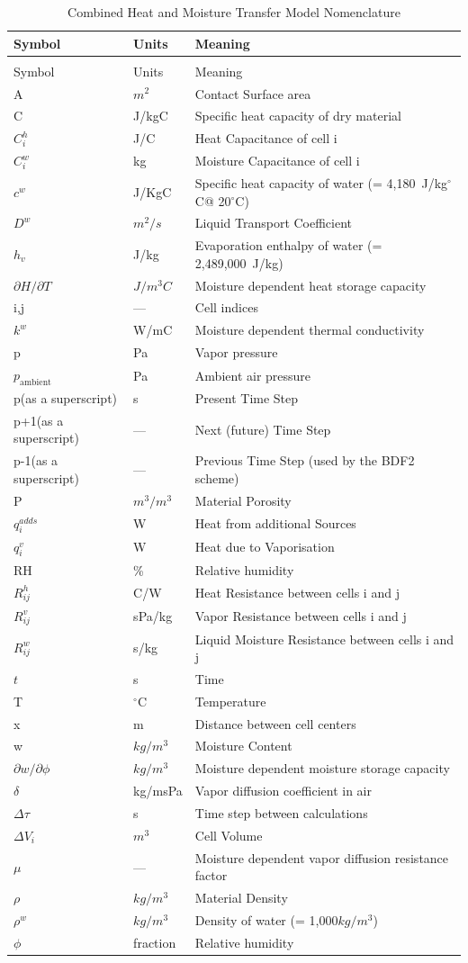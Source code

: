 \begin{longtable}[c]{p{1.5in}p{1.0in}p{3.5in}}
\caption{Combined Heat and Moisture Transfer Model Nomenclature \label{table:combined-heat-and-moisture-transfer-model}} \tabularnewline
\toprule
Symbol & Units & Meaning \tabularnewline
\midrule
\endfirsthead

\caption[]{Combined Heat and Moisture Transfer Model Nomenclature} \tabularnewline
\toprule
Symbol & Units & Meaning \tabularnewline
\midrule
\endhead

A & $m^2$ & Contact Surface area \tabularnewline
C & J/kgC & Specific heat capacity of dry material \tabularnewline
$C_i^h$ & J/C & Heat Capacitance of cell i \tabularnewline
$C_i^w$ & kg & Moisture Capacitance of cell i \tabularnewline
$c^{w}$ & J/KgC & Specific heat capacity of water (= 4,180~J/kg$^{\circ}$C@ 20$^{\circ}$C) \tabularnewline
${D^w}$ & $m^2/s$ & Liquid Transport Coefficient \tabularnewline
${h_v}$ & J/kg & Evaporation enthalpy of water (= 2,489,000~J/kg) \tabularnewline
$\partial{H}/\partial{T}$ & $J/m^3C$ & Moisture dependent heat storage capacity \tabularnewline
i,j & --- & Cell indices \tabularnewline
${k^w}$ & W/mC & Moisture dependent thermal conductivity \tabularnewline
p & Pa & Vapor pressure \tabularnewline
$p_{\text{ambient}}$ & Pa & Ambient air pressure \tabularnewline
p(as a superscript) & s & Present Time Step \tabularnewline
p+1(as a superscript) & --- & Next (future) Time Step \tabularnewline
p-1(as a superscript) & --- & Previous Time Step (used by the BDF2 scheme) \tabularnewline
P & $m^3/m^3$ & Material Porosity \tabularnewline
${q_i^{adds}}$ & W & Heat from additional Sources \tabularnewline
${q_i^v}$ & W & Heat due to Vaporisation \tabularnewline
RH & \% & Relative humidity \tabularnewline
$R_{ij}^h$ & C/W & Heat Resistance between cells i and j \tabularnewline
$R_{ij}^v$ & sPa/kg & Vapor Resistance between cells i and j \tabularnewline
$R_{ij}^w$ & s/kg & Liquid Moisture Resistance between cells i and j \tabularnewline
$t$ & s & Time \tabularnewline
T & $^\circ$C & Temperature \tabularnewline
x & m & Distance between cell centers \tabularnewline
w & $kg/m^3$ & Moisture Content \tabularnewline
$\partial{w}/\partial{\phi}$ & $kg/m^3$ & Moisture dependent moisture storage capacity \tabularnewline
$\delta$ & kg/msPa & Vapor diffusion coefficient in air \tabularnewline
$\Delta \tau$ & s & Time step between calculations \tabularnewline
$\Delta {V_i}$ & $m^3$ & Cell Volume \tabularnewline
$\mu$ & --- & Moisture dependent vapor diffusion resistance factor \tabularnewline
$\rho$ & $kg/m^3$ & Material Density \tabularnewline
${\rho}^w$ & $kg/m^3$ & Density of water (= 1,000$kg/m^3$) \tabularnewline
$\phi$ & fraction & Relative humidity \tabularnewline
\bottomrule
\end{longtable}


